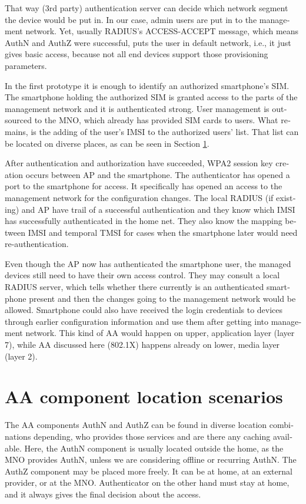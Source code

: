 \documentclass[12pt,a4paper,english]{tutthesis}
\begin{document}
\begin{otherlanguage}{english}
That way (3rd party) authentication server can decide which network
segment the device would be put in.  In our case, admin users are put in
to the management network.  Yet, usually RADIUS's ACCESS-ACCEPT message,
which means AuthN and AuthZ were successful,  puts the user in
default network, i.e., it just gives basic access, because 
not all end devices support those provisioning parameters.

In the first prototype it is enough to identify an authorized
smartphone's SIM.  The smartphone holding the authorized SIM is granted access to
the parts of the management network and it is authenticated strong.  User
management is outsourced to the MNO, which
already has provided SIM cards to users. What remains, is the adding
of the user's IMSI to the authorized users' list. That list can be
located on diverse places, as can be seen in Section \ref{sec-4-2}.


After authentication and authorization have succeeded, WPA2 session key
creation occurs between AP and the smartphone. 
The authenticator has opened a port to the smartphone for
access. It specifically has opened an access to the management network for
the configuration changes. 
The local RADIUS (if existing) and AP have trail of a successful
authentication and they know which IMSI has successfully authenticated in
the home net. They also know the mapping between IMSI and temporal TMSI for
cases when the smartphone later would need re-authentication.


Even though the AP now has authenticated the smartphone user, the managed devices still 
need to have their own access control.
They may consult a local RADIUS server, which tells whether there currently is an
authenticated smartphone present and then the changes going
to the management network would be allowed. Smartphone could also have
received the login credentials to devices through earlier 
configuration information and use them after getting into management
network. This kind of AA would happen on upper, application layer
(layer 7), while AA discussed here (802.1X) happens already on lower, media layer (layer 2).

\section{AA component location scenarios}
\label{sec-4-2}


The AA components AuthN and AuthZ can be found in diverse location
combinations
depending, who provides those services and are there any caching
available. 
Here, the AuthN component 
is usually located outside the home, as the MNO provides AuthN, unless
we are considering offline or recurring AuthN.
The AuthZ component may be placed more freely. It can be at
home, at an external provider, or at the MNO.
Authenticator on the other hand must stay at home, and it always 
gives the final decision about the access.


\end{otherlanguage}
\end{document}
